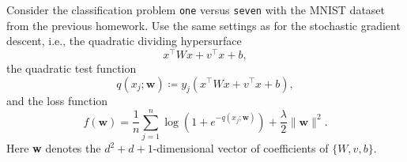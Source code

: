 \documentclass{../kin_math}
\begin{document}
\begin{questions}
  \question Consider the classification problem \texttt{one} versus \texttt{seven} with the MNIST dataset from the previous homework. Use the same settings as for the stochastic gradient descent, i.e., the quadratic dividing hypersurface
  \begin{equation*}
    x^\top W x + v^\top x + b,
  \end{equation*}
  the quadratic test function
  \begin{equation*}
    q(x_j; \textbf{w}) \coloneqq y_j\left(x^\top W x + v^\top x + b\right),
  \end{equation*}
  and the loss function
  \begin{equation*}
    f(\textbf{w}) = \frac{1}{n} \sum_{j = 1}^n \log\left(1 + e^{-q(x_j; \textbf{w})}\right) + \frac{\lambda}{2} \lVert \textbf{w} \rVert^2.
  \end{equation*}
  Here \textbf{w} denotes the $d^2 + d + 1$-dimensional vector of coefficients of $\{W, v, b\}$.


\end{questions}
\end{document}
